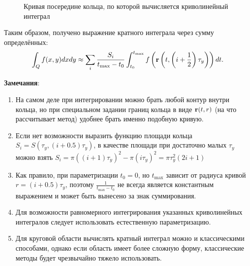 \documentclass[a4paper, 12pt]{article}
\begin{document}
\begin{figure}[h!]
  \noindent{}
  \caption{Кривая посередине кольца, по которой вычисляется криволинейный интеграл}
  \label{plast3}
  \end{figure} 

Таким образом, получено выражение кратного интеграла через сумму определённых:
$$\int_Q f(x,y)dx dy \approx \sum_i \frac{S_i}{t_{\max}-t_0} \int^{t_{\max}}_{t_0} f\left({\bf r}\left(t,\left(i+\frac{1}{2}\right)\tau_y\right)\right)dt.$$  

{\bf Замечания}:
\begin{enumerate}
  \item На самом деле при интегрировании можно брать любой контур внутри кольца, но при специальном задании границ кольца в виде ${\bf r}(t,r)$ (на что рассчитывает метод) удобнее брать именно подобную кривую.
   \item Если нет возможности выразить функцию площади кольца $S_i=S(\tau_y,(i+0.5)\tau_y)$, в качестве площади при достаточно малых $\tau_y$ можно взять $S_i=\pi ((i+1)\tau_y)^2-\pi (i \tau_y)^2= \pi \tau^2_y (2i+1)$
   \item Как правило, при параметризации $t_0=0$, но $t_{\max}$ зависит от радиуса кривой $r=(i+0.5)\tau_y$, поэтому $\frac{1}{t_{\max}-t_0}$ не всегда является константным выражением и может быть вынесено за знак суммирования.
\item Для возможности равномерного интегрирования указанных криволинейных интегралов следует использовать естественную параметризацию.
\item Для круговой области вычислять кратный интеграл можно и классическими способами, однако если область имеет более сложную форму, классические методы будет чрезвычайно тяжело использовать. 
\end{enumerate}
\end{document}
